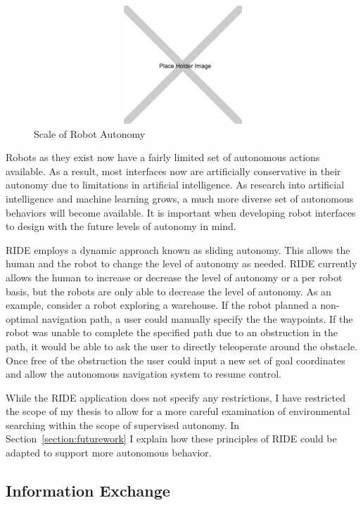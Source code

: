 \begin{figure}[ht]
\begin{center}
\includegraphics[width=5in,height=1.75in]{images/placeholder.png}
\caption{Scale of Robot Autonomy\label{fig:autonomy}}
\end{center}
\end{figure}

Robots as they exist now have a fairly limited set of autonomous actions available. As a result, most interfaces now are artificially conservative in their autonomy due to limitations in artificial intelligence. As research into artificial intelligence and machine learning grows, a much more diverse set of autonomous behaviors will become available. It is important when developing robot interfaces to design with the future levels of autonomy in mind. 

RIDE employs a dynamic approach known as sliding autonomy. This allows the human and the robot to change the level of autonomy as needed. RIDE currently allows the human to increase or decrease the level of autonomy or a per robot basis, but the robots are only able to decrease the level of autonomy. As an example, consider a robot exploring a warehouse. If the robot planned a non-optimal navigation path, a user could manually specify the the waypoints. If the robot was unable to complete the specified path due to an obstruction in the path, it would be able to ask the user to directly teleoperate around the obstacle. Once free of the obstruction the user could input a new set of goal coordinates and allow the autonomous navigation system to resume control.

While the RIDE application does not specify any restrictions, I have restricted the scope of my thesis to allow for a more careful examination of environmental searching within the scope of supervised autonomy. In Section~\ref{section:futurework} I explain how these principles of RIDE could be adapted to support more autonomous behavior.

\subsection{Information Exchange}

